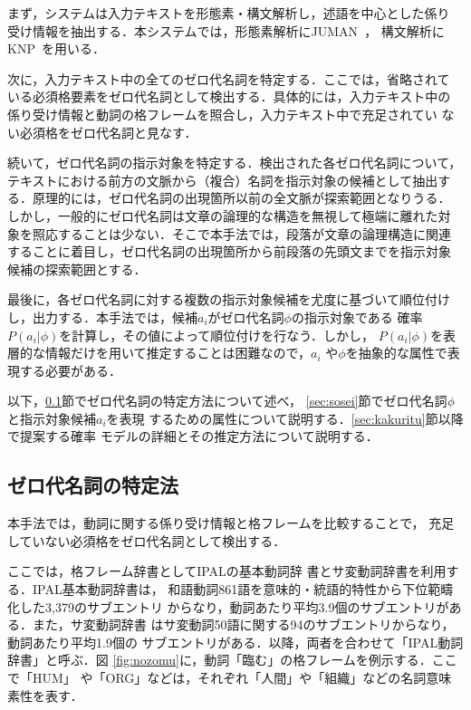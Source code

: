 まず，システムは入力テキストを形態素・構文解析し，述語を中心とした係り
受け情報を抽出する．本システムでは，形態素解析にJUMAN~\cite{juman98}，
構文解析にKNP~\cite{knp98}を用いる．

次に，入力テキスト中の全てのゼロ代名詞を特定する．ここでは，省略されて
いる必須格要素をゼロ代名詞として検出する．具体的には，入力テキスト中の
係り受け情報と動詞の格フレームを照合し，入力テキスト中で充足されてい
ない必須格をゼロ代名詞と見なす．

続いて，ゼロ代名詞の指示対象を特定する．検出された各ゼロ代名詞について，
テキストにおける前方の文脈から（複合）名詞を指示対象の候補として抽出す
る．原理的には，ゼロ代名詞の出現箇所以前の全文脈が探索範囲となりうる．
しかし，一般的にゼロ代名詞は文章の論理的な構造を無視して極端に離れた対
象を照応することは少ない．そこで本手法では，段落が文章の論理構造に関連
することに着目し，ゼロ代名詞の出現箇所から前段落の先頭文までを指示対象
候補の探索範囲とする．

最後に，各ゼロ代名詞に対する複数の指示対象候補を尤度に基づいて順位付け
し，出力する．本手法では，候補$a_i$がゼロ代名詞$\phi$の指示対象である
確率$P(a_i|\phi)$を計算し，その値によって順位付けを行なう．しかし，
$P(a_i|\phi)$を表層的な情報だけを用いて推定することは困難なので，$a_i$
や$\phi$を抽象的な属性で表現する必要がある．

以下，\ref{sec:detection}節でゼロ代名詞の特定方法について述べ，
\ref{sec:sosei}節でゼロ代名詞${\it \phi}$と指示対象候補$a_i$を表現
するための属性について説明する．\ref{sec:kakuritu}節以降で提案する確率
モデルの詳細とその推定方法について説明する．


\subsection{ゼロ代名詞の特定法}
\label{sec:detection}

本手法では，動詞に関する係り受け情報と格フレームを比較することで，
充足していない必須格をゼロ代名詞として検出する．

ここでは，格フレーム辞書としてIPALの基本動詞辞
書\cite{ipal87}とサ変動詞辞書を利用する．IPAL基本動詞辞書は，
和語動詞861語を意味的・統語的特性から下位範疇化した3,379のサブエントリ
からなり，動詞あたり平均3.9個のサブエントリがある．また，サ変動詞辞書
はサ変動詞50語に関する94のサブエントリからなり，動詞あたり平均1.9個の
サブエントリがある．以降，両者を合わせて「IPAL動詞辞書」と呼ぶ．図
\ref{fig:nozomu}に，動詞「臨む」の格フレームを例示する．ここで「HUM」
や「ORG」などは，それぞれ「人間」や「組織」などの名詞意味素性を表す．

